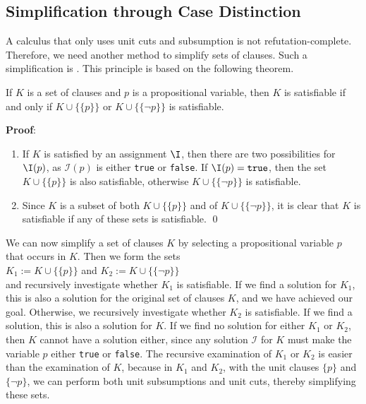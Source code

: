 \subsection{Simplification through Case Distinction}
A calculus that only uses unit cuts and subsumption is not refutation-complete. Therefore, we need another method to simplify sets of clauses.
Such a simplification is . This principle is based on the following theorem.

\begin{Proposition}
  If $K$ is a set of clauses and $p$ is a propositional variable,
  then $K$ is satisfiable if and only if $K \cup \bigl\{\{p\}\bigr\}$ or
  $K \cup \bigl\{\{\neg p\}\bigr\}$ is satisfiable.
\end{Proposition}

\noindent
\textbf{Proof}:
\begin{enumerate}
\item[``$\Rightarrow$'':] 
  If $K$ is satisfied by an assignment $\I$, then there are two possibilities for $\I(p)$, as 
  $\mathcal{I}(p)$ is either \texttt{true} or \texttt{false}. If $\I(p) = \texttt{true}$, then the set $K \cup
  \bigl\{\{p\}\bigr\}$ is also satisfiable,
  otherwise $K \cup \bigl\{\{\neg p\}\bigr\}$
  is satisfiable.
\item[``$\Leftarrow$'':] 
  Since $K$ is a subset of both $K \cup \bigl\{\{p\}\bigr\}$ and of 
  $K \cup \bigl\{\{\neg p\}\bigr\}$, it is clear that $K$ is satisfiable
  if any of these sets is satisfiable.
\qed
\end{enumerate}

We can now simplify a set of clauses $K$ by selecting a propositional variable $p$ that occurs in $K$.
Then we form the sets \\[0.2cm]
\hspace*{1.3cm} $K_1 := K \cup \bigl\{\{p\}\bigr\}$ \quad and \quad $K_2 := K \cup
\bigl\{\{\neg p\}\bigr\}$
\\[0.2cm]
and recursively investigate whether $K_1$ is satisfiable. If we find a solution for $K_1$,
this is also a solution for the original set of clauses $K$, and we have achieved our goal.
Otherwise, we recursively investigate whether $K_2$ is satisfiable.
If we find a solution, this is also a solution for $K$. If we find no solution
for either $K_1$ or $K_2$, then $K$ cannot have a solution either,
since any solution $\mathcal{I}$ for $K$ must make the variable $p$ either \texttt{true} or \texttt{false}.
The recursive examination of $K_1$ or $K_2$ is easier than the examination of $K$,
because in $K_1$ and $K_2$, with the unit clauses $\{p\}$ and $\{\neg p\}$,
we can perform both unit subsumptions and unit cuts, thereby simplifying these sets.

